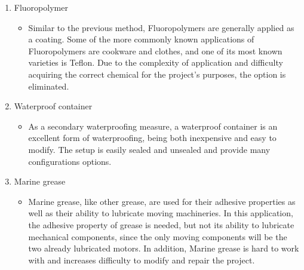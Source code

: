 \begin{enumerate}
\begin{itemize}
          \end{itemize}
    \item Fluoropolymer
          \begin{itemize}
              \item Similar to the previous method, Fluoropolymers are generally applied as a coating. Some of the more commonly known applications of Fluoropolymers are cookware and clothes, and one of its most known varieties is Teflon. Due to the complexity of application and difficulty acquiring the correct chemical for the project’s purposes, the option is eliminated.
          \end{itemize}
    \item Waterproof container
          \begin{itemize}
              \item As a secondary waterproofing measure, a waterproof container is an excellent form of waterproofing, being both inexpensive and easy to modify. The setup is easily sealed and unsealed and provide many configurations options.
          \end{itemize}
    \item Marine grease 
    \begin{itemize}
        \item Marine grease, like other grease, are used for their adhesive properties as well as their ability to lubricate moving machineries. In this application, the adhesive property of grease is needed, but not its ability to lubricate mechanical components, since the only moving components will be the two already lubricated motors. In addition, Marine grease is hard to work with and increases difficulty to modify and repair the project.
    \end{itemize}
\end{enumerate}







